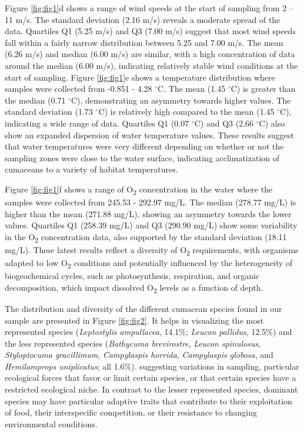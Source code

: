 Figure \ref{fig:fig1}d shows a range of wind speeds at the start of sampling from 2 – 11 m/s. The standard deviation (2.16 m/s) reveals a moderate spread of the data. Quartiles Q1 (5.25 m/s) and Q3 (7.00 m/s) suggest that most wind speeds fall within a fairly narrow distribution between 5.25 and 7.00 m/s. The mean (6.26 m/s) and median (6.00 m/s) are similar, with a high concentration of data around the median (6.00 m/s), indicating relatively stable wind conditions at the start of sampling.
Figure \ref{fig:fig1}e shows a temperature distribution where samples were collected from -0.851 - 4.28 $^\circ$C. The mean (1.45 $^\circ$C) is greater than the median (0.71 $^\circ$C), demonstrating an asymmetry towards higher values. The standard deviation (1.73 $^\circ$C) is relatively high compared to the mean (1.45 $^\circ$C), indicating a wide range of data. Quartiles Q1 (0.07 $^\circ$C) and Q3 (2.66 $^\circ$C) also show an expanded dispersion of water temperature values. These results suggest that water temperatures were very different depending on whether or not the sampling zones were close to the water surface, indicating acclimatization of cumaceans to a variety of habitat temperatures.

Figure \ref{fig:fig1}f shows a range of O\textsubscript{2} concentration in the water where the samples were collected from 245.53 - 292.97 mg/L. The median (278.77 mg/L) is higher than the mean (271.88 mg/L), showing an asymmetry towards the lower values. Quartiles Q1 (258.39 mg/L) and Q3 (290.90 mg/L) show some variability in the O\textsubscript{2} concentration data, also supported by the standard deviation (18.11 mg/L). These latest results reflect a diversity of O\textsubscript{2}  requirements, with organisms adapted to low O\textsubscript{2} conditions and potentially influenced by the heterogeneity of biogeochemical cycles, such as photosynthesis, respiration, and organic decomposition, which impact dissolved O\textsubscript{2} levels as a function of depth.

The distribution and diversity of the different cumacean species found in our sample are presented in Figure \ref{fig:fig2}. It helps in visualizing the most represented species (\emph{Leptostylis ampullacea}, 14.1\%; \emph{Leucon pallidus}, 12.5\%) and the less represented species (\emph{Bathycuma brevirostre}, \emph{Leucon spinulosus}, \emph{Styloptocuma gracillimum}, \emph{Campylaspis horrida}, \emph{Campylaspis globosa}, and \emph{Hemilamprops uniplicatus}; all 1.6\%). suggesting variations in sampling, particular ecological forces that favor or limit certain species, or that certain species have a restricted ecological niche. In contrast to the lesser represented species, dominant species may have particular adaptive traits that contribute to their exploitation of food, their interspecific competition, or their resistance to changing environmental conditions.

